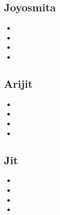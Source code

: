\documentclass{article}
\begin{document}
\newpage
\subsection*{Joyosmita}
\begin{itemize}
    \item 
    \item 
    \item 
    \item 
\end{itemize}

\newpage
\subsection*{Arijit}
\begin{itemize}
    \item 
    \item 
    \item 
    \item 
\end{itemize}

\newpage
\subsection*{Jit}
\begin{itemize}
    \item 
    \item 
    \item 
    \item 
\end{itemize}
\end{document}
